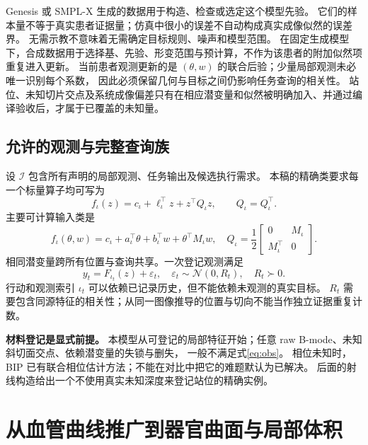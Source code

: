 \documentclass[11pt,a4paper]{article}
\numberwithin{equation}{section}
\theoremstyle{definition}
\newcommand{\N}{\mathcal N}
\begin{document}
Genesis 或 SMPL-X 生成的数据用于构造、检查或选定这个模型先验。
它们的样本量不等于真实患者证据量；仿真中很小的误差不自动构成真实成像似然的误差界。
无需示教不意味着无需确定目标规则、噪声和模型范围。
在固定生成模型下，合成数据用于选择基、先验、形变范围与预计算，不作为该患者的附加似然项重复进入更新。
当前患者观测更新的是 \((\theta,w)\) 的联合后验；少量局部观测未必唯一识别每个系数，
因此必须保留几何与目标之间仍影响任务查询的相关性。
站位、未知切片交点及系统成像偏差只有在相应潜变量和似然被明确加入、并通过编译验收后，才属于已覆盖的未知量。

\subsection{允许的观测与完整查询族}
设 \(\mathcal I\) 包含所有声明的局部观测、任务输出及候选执行需求。
本稿的精确类要求每一个标量算子均可写为
\begin{equation}
 f_\iota(z)=c_\iota+\ell_\iota^\top z+z^\top Q_\iota z,
 \qquad Q_\iota=Q_\iota^\top .
 \label{eq:q}
\end{equation}
主要可计算输入类是
\begin{equation}
 f_\iota(\theta,w)=c_\iota+a_\iota^\top\theta+b_\iota^\top w+
          \theta^\top M_\iota w,
 \quad Q_\iota=\frac12\begin{bmatrix}0&M_\iota\\M_\iota^\top&0\end{bmatrix}.
 \label{eq:bilinear}
\end{equation}
相同潜变量跨所有位置与查询共享。一次登记观测满足
\begin{equation}
 y_t=F_{\iota_t}(z)+\varepsilon_t,
 \quad \varepsilon_t\sim\N(0,R_t),\quad R_t\succ0 .
 \label{eq:obs}
\end{equation}
行动和观测索引 \(\iota_t\) 可以依赖已记录历史，但不能依赖未观测的真实目标。
\(R_t\) 需要包含同源特征的相关性；从同一图像推导的位置与切向不能当作独立证据重复计数。

\textbf{材料登记是显式前提。}
本模型从可登记的局部特征开始；任意 raw B-mode、未知斜切面交点、依赖潜变量的失锁与删失，
一般不满足式\eqref{eq:obs}。
相位未知时，BIP 已有联合相位估计方法\cite{bip}；不能在对比中把它的难题默认为已解决。
后面的射线构造给出一个不使用真实未知深度来登记站位的精确实例。

\section{从血管曲线推广到器官曲面与局部体积}
\label{sec:geometry}
\end{document}
